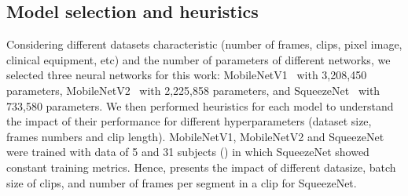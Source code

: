 \documentclass[mlabstract,twocolumn]{jmlr}
\begin{document}
\subsection{Model selection and heuristics}
Considering different datasets characteristic (number of frames, clips, pixel image, clinical equipment, etc) and the number of parameters of different networks,
we selected three neural networks for this work:
MobileNetV1~\citep{2017-howared_CoRR_MobileNetV1} with 3,208,450 parameters, MobileNetV2~\citep{Sandler_2018_CVPR_MobileNetV2} with 2,225,858 parameters, and SqueezeNet~\citep{iandola2017squeezenet} with 733,580 parameters.
We then performed heuristics for each model to understand the impact of their performance for different hyperparameters (dataset size, frames numbers and clip length). %
MobileNetV1, MobileNetV2 and SqueezeNet were trained with data of 5 and 31 subjects () in which SqueezeNet showed constant training metrics.
Hence,  presents 
the impact of different datasize, batch size of clips, and number of frames per segment in a clip for SqueezeNet.
\end{document}
